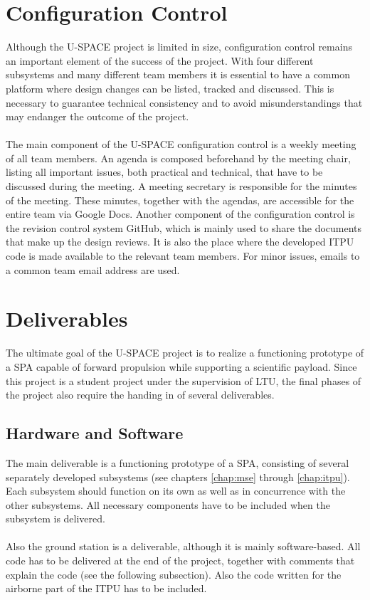 \section{Configuration Control}
%
Although the \ac{U-SPACE} project is limited in size, configuration control remains an important element of the success of the project. With four different subsystems and many different team members it is essential to have a common platform where design changes can be listed, tracked and discussed. This is necessary to guarantee technical consistency and to avoid misunderstandings that may endanger the outcome of the project.
\\
\\
The main component of the \ac{U-SPACE} configuration control is a weekly meeting of all team members. An agenda is composed beforehand by the meeting chair, listing all important issues, both practical and technical, that have to be discussed during the meeting. A meeting secretary is responsible for the minutes of the meeting. These minutes, together with the agendas, are accessible for the entire team via Google Docs. Another component of the configuration control is the revision control system GitHub, which is mainly used to share the documents that make up the design reviews. It is also the place where the developed \ac{ITPU} code is made available to the relevant team members. For minor issues, emails to a common team email address are used.
%
\section{Deliverables}
%
The ultimate goal of the \ac{U-SPACE} project is to realize a functioning prototype of a \ac{SPA} capable of forward propulsion while supporting a scientific payload. Since this project is a student project under the supervision of \ac{LTU}, the final phases of the project also require the handing in of several deliverables.
%
\subsection{Hardware and Software}
%
The main deliverable is a functioning prototype of a \ac{SPA}, consisting of several separately developed subsystems (see chapters \ref{chap:mse} through \ref{chap:itpu}). Each subsystem should function on its own as well as in concurrence with the other subsystems. All necessary components have to be included when the subsystem is delivered.
\\
\\
Also the ground station is a deliverable, although it is mainly software-based. All code has to be delivered at the end of the project, together with comments that explain the code (see the following subsection). Also the code written for the airborne part of the \ac{ITPU} has to be included.
%
